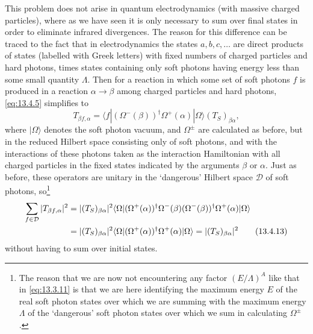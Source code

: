 This problem does not arise in quantum electrodynamics (with massive charged
particles), where as we have seen it is only necessary to sum over final states
in order to eliminate infrared divergences. The reason for this difference can
be traced to the fact that in electrodynamics the states $a,b,c,\ldots$ are
direct products of states (labelled with Greek letters) with fixed numbers of
charged particles and hard photons, times states containing only soft photons
having energy less than some small quantity $\Lambda$. Then for a reaction in
which some set of soft photons $f$ is produced in a reaction $\alpha\to\beta$
among charged particles and hard photons, \eqref{eq:13.4.5}
simplifies to
\begin{equation}
T_{\beta f,\alpha}
=\langle f|(\Omega^-(\beta))^\dagger\Omega^+(\alpha)|\Omega\rangle
(T_S)_{\beta\alpha},
\tag{13.4.12}\label{eq:13.4.12}
\end{equation}
where $|\Omega\rangle$ denotes the soft photon vacuum, and $\Omega^\pm$ are
calculated as before, but in the reduced Hilbert space consisting only of soft
photons, and with the interactions of these photons taken as the interaction
Hamiltonian with all charged particles in the fixed states indicated by the
arguments $\beta$ or $\alpha$. Just as before, these operators are unitary in
the `dangerous' Hilbert space $\mathcal D$ of soft photons,
so\footnote{The reason that we are now not encountering any factor
$(E/\Lambda)^A$ like that in \eqref{eq:13.3.11} is that we are here
identifying the maximum energy $E$ of the real soft photon states over which we
are summing with the maximum energy $\Lambda$ of the `dangerous' soft photon
states over which we sum in calculating $\Omega^\pm$.}
\begin{align}
\sum_{f\in\mathcal D}|T_{\beta f,\alpha}|^2
={}&|(T_S)_{\beta\alpha}|^2
\langle\Omega|(\Omega^+(\alpha))^\dagger\Omega^-(\beta)
(\Omega^-(\beta))^\dagger\Omega^+(\alpha)|\Omega\rangle\notag\\
={}&|(T_S)_{\beta\alpha}|^2
\langle\Omega|(\Omega^+(\alpha))^\dagger
\Omega^+(\alpha)|\Omega\rangle
=|(T_S)_{\beta\alpha}|^2
\tag{13.4.13}\label{eq:13.4.13}
\end{align}
without having to sum over initial states.
